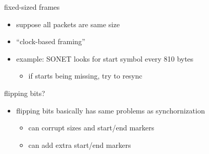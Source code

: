 \begin{frame}{fixed-sized frames}
    \begin{itemize}
    \item suppose all packets are same size
    \item ``clock-based framing''
    \item example: SONET looks for start symbol every 810 bytes
        \begin{itemize}
        \item if starts being missing, try to resync
        \end{itemize}
    \end{itemize}
\end{frame}


\begin{frame}{flipping bits?}
    \begin{itemize}
    \item flipping bits basically has same problems as synchornization
        \begin{itemize}
        \item can corrupt sizes and start/end markers
        \item can add extra start/end markers
        \end{itemize}
    \end{itemize}
\end{frame}
